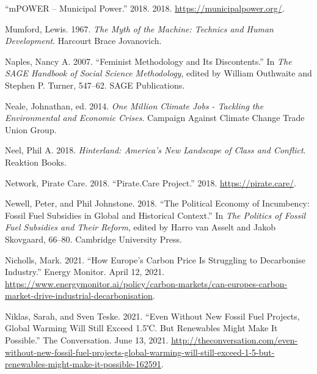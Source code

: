 \documentclass[a4paper, nobind]{templates/ociamthesis}
\newlength{\cslhangindent}
\newenvironment{CSLReferences}[2] %
 {%
  \setlength{\parindent}{0pt}
  \ifodd #1
  \let\oldpar\par
  \def\par{\hangindent=\cslhangindent\oldpar}
  \fi
  \setlength{\parskip}{1mm}
  \setlength{\baselineskip}{6mm}
 }%
 {}
\begin{document}
\begin{CSLReferences}{1}{0}
\leavevmode{}%
{``{mPOWER} -- {Municipal Power}.''} 2018. 2018. \url{https://municipalpower.org/}.

\leavevmode{}%
Mumford, Lewis. 1967. \emph{The {Myth} of the {Machine}: {Technics} and Human Development}. {Harcourt Brace Jovanovich}.

\leavevmode{}%
Naples, Nancy A. 2007. {``Feminist Methodology and Its Discontents.''} In \emph{The {SAGE} Handbook of Social Science Methodology}, edited by William Outhwaite and Stephen P. Turner, 547--62. {SAGE Publications}.

\leavevmode{}%
Neale, Johnathan, ed. 2014. \emph{One {Million Climate Jobs} - {Tackling} the {Environmental} and {Economic Crises}}. {Campaign Against Climate Change Trade Union Group}.

\leavevmode{}%
Neel, Phil A. 2018. \emph{Hinterland: {America}'s {New Landscape} of {Class} and {Conflict}}. {Reaktion Books}.

\leavevmode{}%
Network, Pirate Care. 2018. {``Pirate.{Care} Project.''} 2018. \url{https://pirate.care/}.

\leavevmode{}%
Newell, Peter, and Phil Johnstone. 2018. {``The {Political Economy} of {Incumbency}: {Fossil Fuel Subsidies} in {Global} and {Historical Context}.''} In \emph{The {Politics} of {Fossil Fuel Subsidies} and Their {Reform}}, edited by Harro van Asselt and Jakob Skovgaard, 66--80. {Cambridge University Press}.

\leavevmode{}%
Nicholls, Mark. 2021. {``How {Europe}'s Carbon Price Is Struggling to Decarbonise Industry.''} {Energy Monitor}. April 12, 2021. \url{https://www.energymonitor.ai/policy/carbon-markets/can-europes-carbon-market-drive-industrial-decarbonisation}.

\leavevmode{}%
Niklas, Sarah, and Sven Teske. 2021. {``Even Without New Fossil Fuel Projects, Global Warming Will Still Exceed 1.5℃. {But} Renewables Might Make It Possible.''} {The Conversation}. June 13, 2021. \url{http://theconversation.com/even-without-new-fossil-fuel-projects-global-warming-will-still-exceed-1-5-but-renewables-might-make-it-possible-162591}.


\end{CSLReferences}
\end{document}
